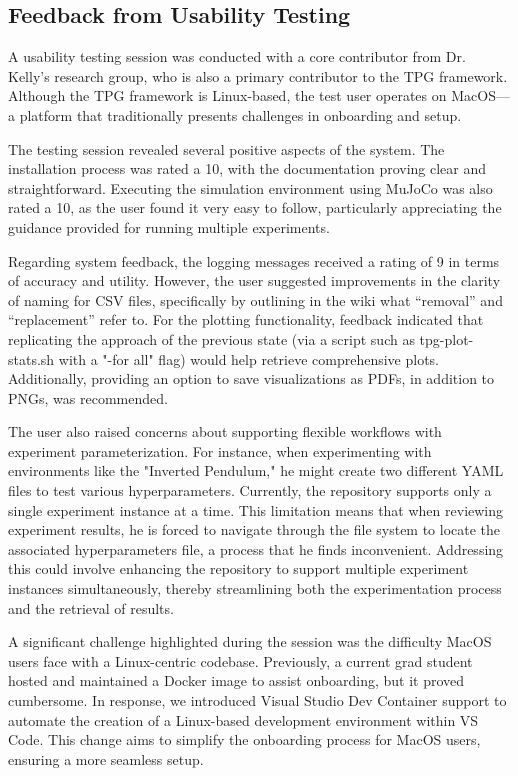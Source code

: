 \documentclass[12pt, titlepage]{article}
\begin{document}
\subsection{Feedback from Usability Testing}
A usability testing session was conducted with a core contributor from Dr. Kelly's research group, who is also a primary contributor to the TPG framework. Although the TPG framework is Linux-based, the test user operates on MacOS—a platform that traditionally presents challenges in onboarding and setup.

The testing session revealed several positive aspects of the system. The installation process was rated a 10, with the documentation proving clear and straightforward. Executing the simulation environment using MuJoCo was also rated a 10, as the user found it very easy to follow, particularly appreciating the guidance provided for running multiple experiments.

Regarding system feedback, the logging messages received a rating of 9 in terms of accuracy and utility. However, the user suggested improvements in the clarity of naming for CSV files, specifically by outlining in the wiki what “removal” and “replacement” refer to. For the plotting functionality, feedback indicated that replicating the approach of the previous state (via a script such as tpg-plot-stats.sh with a "-for all" flag) would help retrieve comprehensive plots. Additionally, providing an option to save visualizations as PDFs, in addition to PNGs, was recommended.

The user also raised concerns about supporting flexible workflows with experiment parameterization. For instance, when experimenting with environments like the "Inverted Pendulum," he might create two different YAML files to test various hyperparameters. Currently, the repository supports only a single experiment instance at a time. This limitation means that when reviewing experiment results, he is forced to navigate through the file system to locate the associated hyperparameters file, a process that he finds inconvenient. Addressing this could involve enhancing the repository to support multiple experiment instances simultaneously, thereby streamlining both the experimentation process and the retrieval of results.

A significant challenge highlighted during the session was the difficulty MacOS users face with a Linux-centric codebase. Previously, a current grad student hosted and maintained a Docker image to assist onboarding, but it proved cumbersome. In response, we introduced Visual Studio Dev Container support to automate the creation of a Linux-based development environment within VS Code. This change aims to simplify the onboarding process for MacOS users, ensuring a more seamless setup.
\end{document}
